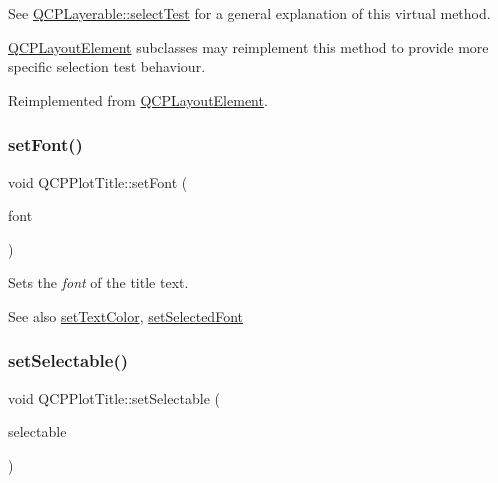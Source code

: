 See \mbox{\hyperlink{class_q_c_p_layerable_a04db8351fefd44cfdb77958e75c6288e}{Q\+C\+P\+Layerable\+::select\+Test}} for a general explanation of this virtual method.

\mbox{\hyperlink{class_q_c_p_layout_element}{Q\+C\+P\+Layout\+Element}} subclasses may reimplement this method to provide more specific selection test behaviour. 

Reimplemented from \mbox{\hyperlink{class_q_c_p_layout_element_a0b96ae0d7bcfa6e38188fcb1e73e143f}{Q\+C\+P\+Layout\+Element}}.

\mbox{\label{class_q_c_p_plot_title_a199fc7170802ea65006c371875349e37}} 
\subsubsection{\texorpdfstring{set\+Font()}{setFont()}}
{\footnotesize\ttfamily void Q\+C\+P\+Plot\+Title\+::set\+Font (\begin{DoxyParamCaption}\item[{const Q\+Font \&}]{font }\end{DoxyParamCaption})}

Sets the {\itshape font} of the title text.

\begin{DoxySeeAlso}{See also}
\mbox{\hyperlink{class_q_c_p_plot_title_a71273e3a0ca6b4c151591b37b9e5ce33}{set\+Text\+Color}}, \mbox{\hyperlink{class_q_c_p_plot_title_a5245980ead999ceed51dbe702d0e3131}{set\+Selected\+Font}} 
\end{DoxySeeAlso}
\mbox{\label{class_q_c_p_plot_title_a8866b07b9fa14877d4cefbf38406c5dd}} 
\subsubsection{\texorpdfstring{set\+Selectable()}{setSelectable()}}
{\footnotesize\ttfamily void Q\+C\+P\+Plot\+Title\+::set\+Selectable (\begin{DoxyParamCaption}\item[{bool}]{selectable }\end{DoxyParamCaption})}

